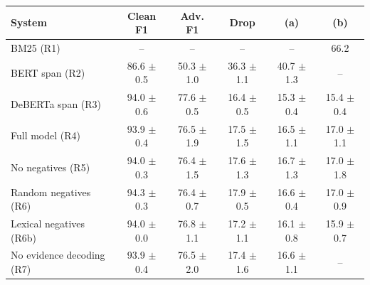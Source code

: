 \begin{tabular}{lccccc}
\hline
System & Clean F1 & Adv. F1 & Drop & (a) & (b) \\
\hline
BM25 (R1) & -- & -- & -- & -- & 66.2 \\
BERT span (R2) & 86.6 $\pm$ 0.5 & 50.3 $\pm$ 1.0 & 36.3 $\pm$ 1.1 & 40.7 $\pm$ 1.3 & -- \\
DeBERTa span (R3) & 94.0 $\pm$ 0.6 & 77.6 $\pm$ 0.5 & 16.4 $\pm$ 0.5 & 15.3 $\pm$ 0.4 & 15.4 $\pm$ 0.4 \\
Full model (R4) & 93.9 $\pm$ 0.4 & 76.5 $\pm$ 1.9 & 17.5 $\pm$ 1.5 & 16.5 $\pm$ 1.1 & 17.0 $\pm$ 1.1 \\
No negatives (R5) & 94.0 $\pm$ 0.3 & 76.4 $\pm$ 1.5 & 17.6 $\pm$ 1.3 & 16.7 $\pm$ 1.3 & 17.0 $\pm$ 1.8 \\
Random negatives (R6) & 94.3 $\pm$ 0.3 & 76.4 $\pm$ 0.7 & 17.9 $\pm$ 0.5 & 16.6 $\pm$ 0.4 & 17.0 $\pm$ 0.9 \\
Lexical negatives (R6b) & 94.0 $\pm$ 0.0 & 76.8 $\pm$ 1.1 & 17.2 $\pm$ 1.1 & 16.1 $\pm$ 0.8 & 15.9 $\pm$ 0.7 \\
No evidence decoding (R7) & 93.9 $\pm$ 0.4 & 76.5 $\pm$ 2.0 & 17.4 $\pm$ 1.6 & 16.6 $\pm$ 1.1 & -- \\
\hline
\end{tabular}
